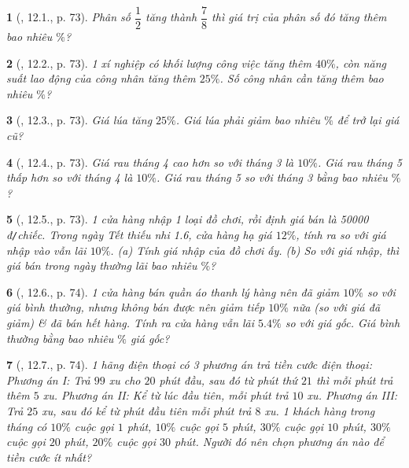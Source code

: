\documentclass{article}
\newtheorem{baitoan}{}
\begin{document}
\begin{baitoan}[\cite{TLCT_THCS_Toan_6_so_hoc}, 12.1., p. 73]
	Phân số $\dfrac{1}{2}$ tăng thành $\dfrac{7}{8}$ thì giá trị của phân số đó tăng thêm bao nhiêu $\%$?
\end{baitoan}

\begin{baitoan}[\cite{TLCT_THCS_Toan_6_so_hoc}, 12.2., p. 73]
	1 xí nghiệp có khối lượng công việc tăng thêm $40\%$, còn năng suất lao động của công nhân tăng thêm $25\%$. Số công nhân cần tăng thêm bao nhiêu $\%$?
\end{baitoan}

\begin{baitoan}[\cite{TLCT_THCS_Toan_6_so_hoc}, 12.3., p. 73]
	Giá lúa tăng $25\%$. Giá lúa phải giảm bao nhiêu $\%$ để trở lại giá cũ?
\end{baitoan}

\begin{baitoan}[\cite{TLCT_THCS_Toan_6_so_hoc}, 12.4., p. 73]
	Giá rau tháng 4 cao hơn so với tháng 3 là $10\%$. Giá rau tháng 5 thấp hơn so với tháng 4 là $10\%$. Giá rau tháng 5 so với tháng 3 bằng bao nhiêu $\%$?
\end{baitoan}

\begin{baitoan}[\cite{TLCT_THCS_Toan_6_so_hoc}, 12.5., p. 73]
	1 cửa hàng nhập 1 loại đồ chơi, rồi định giá bán là {\rm50000 đ{\tt/}chiếc}. Trong ngày Tết thiếu nhi 1.6, cửa hàng hạ giá $12\%$, tính ra so với giá nhập vào vẫn lãi $10\%$. (a) Tính giá nhập của đồ chơi ấy. (b) So với giá nhập, thì giá bán trong ngày thường lãi bao nhiêu $\%$?
\end{baitoan}

\begin{baitoan}[\cite{TLCT_THCS_Toan_6_so_hoc}, 12.6., p. 74]
	1 cửa hàng bán quần áo thanh lý hàng nên đã giảm $10\%$ so với giá bình thường, nhưng không bán được nên giảm tiếp $10\%$ nữa (so với giá đã giảm) \& đã bán hết hàng. Tính ra cửa hàng vẫn lãi $5.4\%$ so với giá gốc. Giá bình thường bằng bao nhiêu $\%$ giá gốc?
\end{baitoan}

\begin{baitoan}[\cite{TLCT_THCS_Toan_6_so_hoc}, 12.7., p. 74]
	1 hãng điện thoại có 3 phương án trả tiền cước điện thoại: Phương án I: Trả $99$ xu cho $20$ phút đầu, sau đó từ phút thứ $21$ thì mỗi phút trả thêm $5$ xu. Phương án II: Kể từ lúc đầu tiên, mỗi phút trả $10$ xu. Phương án III: Trả $25$ xu, sau đó kể từ phút đầu tiên mỗi phút trả $8$ xu. 1 khách hàng trong tháng có $10\%$ cuộc gọi $1$ phút, $10\%$ cuộc gọi $5$ phút, $30\%$ cuộc gọi $10$ phút, $30\%$ cuộc gọi $20$ phút, $20\%$ cuộc gọi $30$ phút. Người đó nên chọn phương án nào để tiền cước ít nhất?
\end{baitoan}
\end{document}
